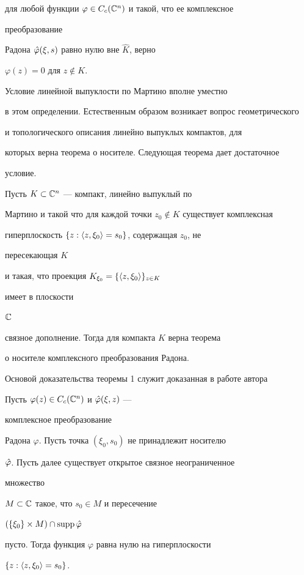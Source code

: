 для любой функции $\varphi\in C_c(\Bbb C^n)$ и такой, что ее комплексное 


преобразование 


Радона $\Hat\varphi(\xi,s)$ равно нулю вне $\widehat K$, верно 


$\varphi(z)=0$ для $z\notin K$. 


 


Условие линейной выпуклости по Мартино вполне уместно


в этом определении. Естественным образом возникает вопрос геометрического 


и топологического описания линейно выпуклых компактов, для 


которых верна теорема о носителе. Следующая теорема дает достаточное 


условие. 


 


\begin{thm} Пусть $K\subset\Bbb C^n$ --- компакт, линейно выпуклый по 


Мартино и такой что для каждой точки $z_0\notin K$ существует комплексная 


гиперплоскость $\{z:\langle z,\xi_0\rangle=s_0\}$, содержащая $z_0$, не 


пересекающая $K$ 


и такая, что проекция $K_{\xi_0}=\{\langle z,\xi_0\rangle\}_{z\in K}$ 


имеет в плоскости 


$\Bbb C$ 


связное дополнение. Тогда для компакта $K$ верна теорема 


о носителе комплексного преобразования Радона. 


\end{thm} 


 


Основой доказательства теоремы 1 служит доказанная в работе автора 


\cite{Sek} 


 


\begin{thm} Пусть $\varphi(z)\in C_c(\Bbb C^n)$ и $\Hat\varphi(\xi,z)$ --- 


комплексное преобразование 


Радона $\varphi$. Пусть точка $(\xi_0,s_0)$ не принадлежит носителю 


$\Hat\varphi$. Пусть далее существует открытое связное неограниченное 


множество 


$M\subset\Bbb C$ такое, что $s_0\in M$ и пересечение 


$(\{\xi_0\}\times M)\cap\operatorname{supp}\Hat\varphi$ 


пусто. Тогда функция $\varphi$ равна нулю на гиперплоскости 


$\{z:\langle z,\xi_0\rangle=s_0\}$. 


\end{thm} 


